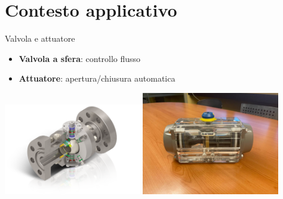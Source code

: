 \documentclass{beamer}
\begin{document}
\section{Contesto applicativo}
\begin{frame}{Valvola e attuatore}
    \begin{itemize}
        \item \textbf{Valvola a sfera}: controllo flusso
        \item \textbf{Attuatore}: apertura/chiusura automatica
    \end{itemize}
    \begin{center}
        \includegraphics[width=0.45\textwidth]{images/Contesto_Applicativo/valvola_sfera.png}
        \hspace{0.05\textwidth}
        \includegraphics[width=0.45\textwidth]{images/Contesto_Applicativo/attuatore.jpg}
    \end{center}
\end{frame}
\end{document}
